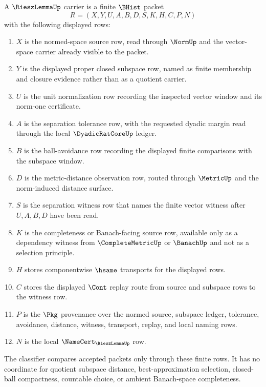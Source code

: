 \begin{definition}
\label{def:riesz-lemma-carrier}
A $\RieszLemmaUp$ carrier is a finite $\BHist$ packet
$$
R=(X,Y,U,A,B,D,S,K,H,C,P,N)
$$
with the following displayed rows:
\begin{enumerate}
\item $X$ is the normed-space source row, read through $\NormUp$ and the vector-space carrier already visible to the packet.
\item $Y$ is the displayed proper closed subspace row, named as finite membership and closure evidence rather than as a quotient carrier.
\item $U$ is the unit normalization row recording the inspected vector window and its norm-one certificate.
\item $A$ is the separation tolerance row, with the requested dyadic margin read through the local $\DyadicRatCoreUp$ ledger.
\item $B$ is the ball-avoidance row recording the displayed finite comparisons with the subspace window.
\item $D$ is the metric-distance observation row, routed through $\MetricUp$ and the norm-induced distance surface.
\item $S$ is the separation witness row that names the finite vector witness after $U,A,B,D$ have been read.
\item $K$ is the completeness or Banach-facing source row, available only as a dependency witness from $\CompleteMetricUp$ or $\BanachUp$ and not as a selection principle.
\item $H$ stores componentwise $\hsame$ transports for the displayed rows.
\item $C$ stores the displayed $\Cont$ replay route from source and subspace rows to the witness row.
\item $P$ is the $\Pkg$ provenance over the normed source, subspace ledger, tolerance, avoidance, distance, witness, transport, replay, and local naming rows.
\item $N$ is the local $\NameCert_{\RieszLemmaUp}$ row.
\end{enumerate}
The classifier compares accepted packets only through these finite rows. It has no coordinate for quotient subspace distance, best-approximation selection, closed-ball compactness, countable choice, or ambient Banach-space completeness.
\end{definition}

